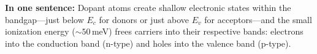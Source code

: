 \documentclass[12pt]{article}
\begin{document}
	\noindent
	\textbf{In one sentence:} 
	Dopant atoms create shallow electronic states within the bandgap---just below \(E_c\) for donors or just above \(E_v\) for acceptors---and the small ionization energy ($\sim50$\,meV) frees carriers into their respective bands: electrons into the conduction band (n-type) and holes into the valence band (p-type).
	
\end{document}
